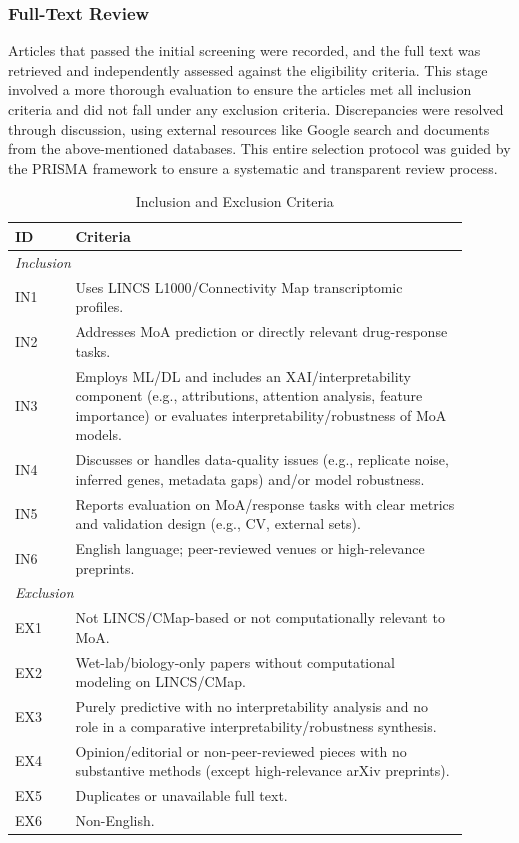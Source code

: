 \documentclass[twocolumn]{article}
\begin{document}
\subsubsection{Full-Text Review}
Articles that passed the initial screening were recorded, and the full text was retrieved and independently assessed against the eligibility criteria.  This stage involved a more thorough evaluation to ensure the articles met all inclusion criteria and did not fall under any exclusion criteria. Discrepancies were resolved through discussion, using external resources like Google search and documents from the above-mentioned databases. This entire selection protocol was guided by the PRISMA framework to ensure a systematic and transparent review process.
\begin{table}[htbp]
\centering
\caption{Inclusion and Exclusion Criteria}
\begin{tabular}{p{0.12\linewidth} p{0.78\linewidth}}
\toprule
\textbf{ID} & \textbf{Criteria} \\
\midrule
\multicolumn{2}{l}{\textit{Inclusion}} \\
IN1 & Uses LINCS L1000/Connectivity Map transcriptomic profiles. \\
IN2 & Addresses MoA prediction or directly relevant drug-response tasks. \\
IN3 & Employs ML/DL and includes an XAI/interpretability component (e.g., attributions, attention analysis, feature importance) or evaluates interpretability/robustness of MoA models. \\
IN4 & Discusses or handles data-quality issues (e.g., replicate noise, inferred genes, metadata gaps) and/or model robustness. \\
IN5 & Reports evaluation on MoA/response tasks with clear metrics and validation design (e.g., CV, external sets). \\
IN6 & English language; peer-reviewed venues or high-relevance preprints. \\
\midrule
\multicolumn{2}{l}{\textit{Exclusion}} \\
EX1 & Not LINCS/CMap-based or not computationally relevant to MoA. \\
EX2 & Wet-lab/biology-only papers without computational modeling on LINCS/CMap. \\
EX3 & Purely predictive with no interpretability analysis and no role in a comparative interpretability/robustness synthesis.\\
EX4 & Opinion/editorial or non-peer-reviewed pieces with no substantive methods (except high-relevance arXiv preprints). \\
EX5 & Duplicates or unavailable full text. \\
EX6 & Non-English. \\
\bottomrule
\end{tabular}
\end{table}
\end{document}
